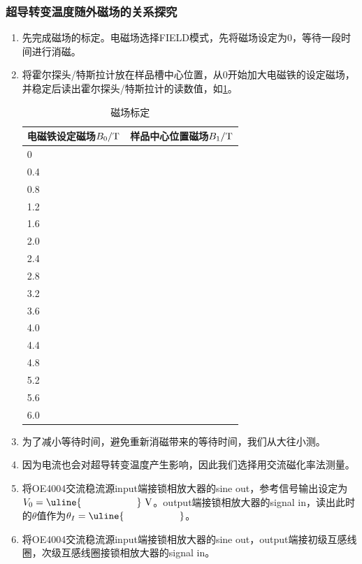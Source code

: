 \documentclass[11pt,a4paper]{ctexart}
\newcommand{\unit}[1]{\rm \ #1}
\begin{document}
 \subsubsection{超导转变温度随外磁场的关系探究}
 \begin{enumerate}
 \item
 先完成磁场的标定。电磁场选择FIELD模式，先将磁场设定为0，等待一段时间进行消磁。
 \item
 将霍尔探头/特斯拉计放在样品槽中心位置，从0开始加大电磁铁的设定磁场，并稳定后读出霍尔探头/特斯拉计的读数值，如\cref{table3}。
 \begin{table}[H]
\centering
\caption{磁场标定\label{table3}}
\begin{tabular}{|p{32mm}|p{32mm}|}
\hline
电磁铁设定磁场$B_0/{\rm T}$ & 样品中心位置磁场$B_1/{\rm T}$ \\ \hline
0 & \\ \hline
0.4  & \\ \hline
0.8   & \\ \hline
1.2   & \\ \hline
1.6  & \\ \hline
2.0  & \\ \hline
2.4    &\\ \hline
2.8    &\\ \hline
3.2    &\\ \hline
 3.6   &\\ \hline
4.0    &\\ \hline
4.4    &\\ \hline
4.8    &\\ \hline
5.2    &\\ \hline
5.6    &\\ \hline
6.0    &\\ \hline
  \end{tabular}
  \end{table} 
  \item
  为了减小等待时间，避免重新消磁带来的等待时间，我们从大往小测。
 \item
 因为电流也会对超导转变温度产生影响，因此我们选择用交流磁化率法测量。
\item
   将OE4004交流稳流源input端接锁相放大器的sine out，参考信号输出设定为$V_0 = \uline{\hspace{20mm}}\unit{V}$。output端接锁相放大器的signal in，读出此时的$\theta$值作为$\theta_I = \uline{\hspace{20mm}}$。
  \item
  将OE4004交流稳流源input端接锁相放大器的sine out，output端接初级互感线圈，次级互感线圈接锁相放大器的signal in。

\end{enumerate}
\end{document}
